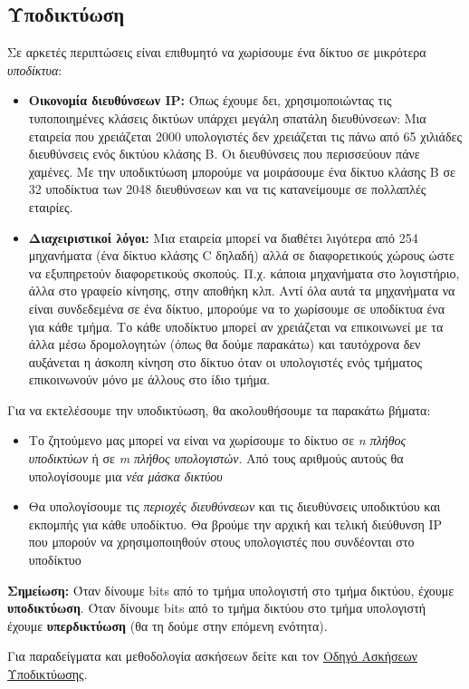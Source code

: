 %
%
\subsection{Υποδικτύωση}
Σε αρκετές περιπτώσεις είναι επιθυμητό να χωρίσουμε ένα δίκτυο σε μικρότερα \emph{υποδίκτυα}:

\begin{itemize}
\item \textbf{Οικονομία διευθύνσεων IP:} Όπως έχουμε δει, χρησιμοποιώντας τις τυποποιημένες κλάσεις δικτύων υπάρχει μεγάλη σπατάλη διευθύνσεων: Μια εταιρεία που χρειάζεται 2000 υπολογιστές δεν χρειάζεται τις πάνω από 65 χιλιάδες διευθύνσεις ενός δικτύου κλάσης Β. Οι διευθύνσεις που περισσεύουν πάνε χαμένες. Με την υποδικτύωση μπορούμε να μοιράσουμε ένα δίκτυο κλάσης Β σε 32 υποδίκτυα των 2048 διευθύνσεων και να τις κατανείμουμε σε πολλαπλές εταιρίες.
\item \textbf{Διαχειριστικοί λόγοι:} Μια εταιρεία μπορεί να διαθέτει λιγότερα από 254 μηχανήματα (ένα δίκτυο κλάσης C δηλαδή) αλλά σε διαφορετικούς χώρους ώστε να εξυπηρετούν διαφορετικούς σκοπούς. Π.χ. κάποια μηχανήματα στο λογιστήριο, άλλα στο γραφείο κίνησης, στην αποθήκη κλπ. Αντί όλα αυτά τα μηχανήματα να είναι συνδεδεμένα σε ένα δίκτυο, μπορούμε να το χωρίσουμε σε υποδίκτυα ένα για κάθε τμήμα. Το κάθε υποδίκτυο μπορεί αν χρειάζεται να επικοινωνεί με τα άλλα μέσω δρομολογητών (όπως θα δούμε παρακάτω) και ταυτόχρονα δεν αυξάνεται η άσκοπη κίνηση στο δίκτυο όταν οι υπολογιστές ενός τμήματος επικοινωνούν μόνο με άλλους στο ίδιο τμήμα.
\end{itemize}

Για να εκτελέσουμε την υποδικτύωση, θα ακολουθήσουμε τα παρακάτω βήματα:

\begin{itemize}
\item Το ζητούμενο μας μπορεί να είναι να χωρίσουμε το δίκτυο σε \emph{n πλήθος υποδικτύων} ή σε \emph{m πλήθος υπολογιστών}. Από τους αριθμούς αυτούς θα υπολογίσουμε μια \emph{νέα μάσκα δικτύου}
\item Θα υπολογίσουμε τις \emph{περιοχές διευθύνσεων} και τις διευθύνσεις υποδικτύου και εκπομπής για κάθε υποδίκτυο. Θα βρούμε την αρχική και τελική διεύθυνση IP που μπορούν να χρησιμοποιηθούν στους υπολογιστές που συνδέονται στο υποδίκτυο
\end{itemize}

\begin{inthebox}
\textbf{Σημείωση:} Όταν δίνουμε bits από το τμήμα υπολογιστή στο τμήμα δικτύου, έχουμε \textbf{υποδικτύωση}. Όταν δίνουμε bits από το τμήμα δικτύου στο τμήμα υπολογιστή έχουμε \textbf{υπερδικτύωση} (θα τη δούμε στην επόμενη ενότητα).

Για παραδείγματα και μεθοδολογία ασκήσεων δείτε και τον  \href{http://www.freebsdworld.gr/diktia/subnetting-guide.pdf}{Οδηγό Ασκήσεων Υποδικτύωσης}.\\
\end{inthebox}


